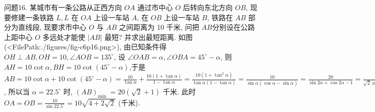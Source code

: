 问题16. 某城市有一条公路从正西方向 $O A$ 通过市中心 $O$ 后转向东北方向 $O B$, 现要修建一条铁路 $L, L$ 在 $O A$ 上设一车站 $A$, 在 $O B$ 上设一车站 $B$, 铁路在 $A B$ 部分为直线段, 现要求市中心 $O$ 与 $A B$ 之间距离为 10 千米, 问把 $A B$分别设在公路上距中心 $O$ 多远处才能使 $|A B|$ 最短? 并求出最短距离.
如图(<FilePath:./figures/fig-c6p16.png>), 由已知条件得 $O H \perp A B, O H=10, \angle A O B=135^{\circ}$, 设 $\angle O A B=\alpha, \angle O B A=45^{\circ}-\alpha$, 则 $A H=10 \cot \alpha, B H=10 \cot \left(45^{\circ}-\alpha\right)$,于是 $A B=10 \cot \alpha+ 10 \cot \left(45^{\circ}-\alpha\right)=\frac{10}{\tan \alpha}+\frac{10(1+\tan \alpha)}{1-\tan \alpha}= \frac{10\left(1+\tan ^2 \alpha\right)}{\tan \alpha(1-\tan \alpha)}=\frac{10}{\sin \alpha(\cos \alpha-\sin \alpha)}=\frac{20}{\sin 2 \alpha+\cos 2 \alpha-1}=\frac{20}{\sqrt{2} \sin \left(2 \alpha+45^{\circ}\right)-1}$, 所以当 $\alpha=22.5^{\circ}$ 时, $(A B)_{\text {min }}= 20(\sqrt{2}+1)$ 千米.
此时 $O A=O B=\frac{10}{\sin 22.5^{\circ}}=10 \sqrt{4+2 \sqrt{2}}$ (千米).



